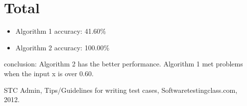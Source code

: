 \documentclass[10pt,a4paper,twoside]{article}
\begin{document}
\section{Total}
\begin{itemize}
    
    \item Algorithm 1 accuracy: 41.60\%
    \item Algorithm 2 accuracy: 100.00\%
\end{itemize}
conclusion: Algorithm 2 has the better performance. Algorithm 1 met problems when the input x is over 0.60.





\begin{thebibliography}{99}  
STC Admin, Tips/Guidelines for writing test cases, Softwaretestingclass.com, 2012.  
\end{thebibliography}
\end{document}
